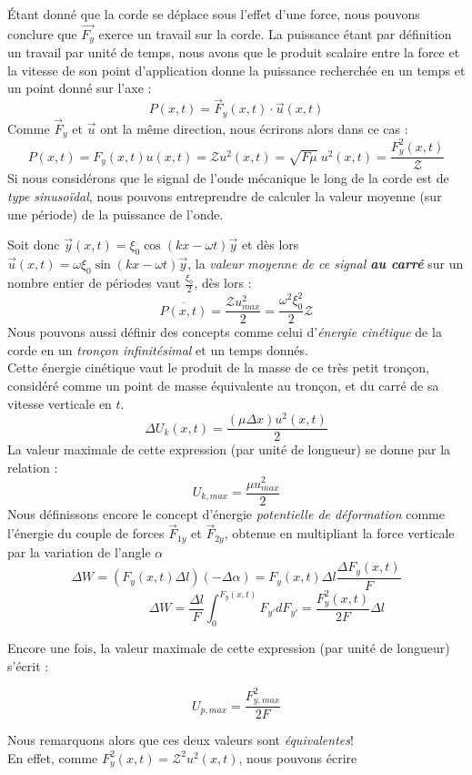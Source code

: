 Étant donné que la corde se déplace sous l'effet d'une force, nous pouvons conclure que $\vec{F_{y}}$ exerce un travail sur la corde. 
La puissance étant par définition un travail par unité de temps, nous avons que le produit scalaire entre la force et la vitesse de son point d'application 
donne la puissance recherchée en un temps et un point donné sur l'axe :
\[P(x,t) = \vec{F}_{y}(x,t) \cdot \vec{u}(x,t) \]
Comme $\vec{F}_{y}$ et $\vec{u}$ ont la même direction, nous écrirons alors dans ce cas : 
\[ P(x,t) = F_{y}(x,t) u(x,t) = \mathcal{Z} u^{2}(x,t) = \sqrt{F \mu}\: u^{2}(x,t) = \frac{F_{y}^2(x,t)}{\mathcal{Z}}\]
Si nous considérons que le signal de l'onde mécanique le long de la corde est de \textit{type sinusoïdal}, 
nous pouvons entreprendre de calculer la valeur moyenne (sur une période) de la puissance de l'onde. 

Soit donc $\vec{y}(x,t) = \xi_{0} \cos(kx-\omega t) \vec{y}$ et dès lors $\vec{u}(x,t) = \omega \xi_{0} \sin(kx-\omega t) \vec{y}$, la \textit{valeur moyenne de ce signal \textbf{au carré}} sur un nombre entier de périodes vaut $\frac{\xi_{0}}{2}$, dès lors : 
\[ \overline{P(x,t)} = \frac{\mathcal{Z} u^{2}_{max}}{2} = \frac{\omega^{2} \xi_{0}^{2}}{2} \mathcal{Z}\]
Nous pouvons aussi définir des concepts comme celui d'\textit{énergie cinétique} de la corde en un \textit{tronçon infinitésimal} et un temps donnés. \\
Cette énergie cinétique vaut le produit de la masse de ce très petit tronçon, considéré comme un point de masse équivalente au tronçon, et du carré de sa vitesse
verticale en $t$. 
\[\Delta U_{k}(x,t) = \frac{(\mu \Delta x)u^{2}(x,t)}{2} \] 
La valeur maximale de cette expression (par unité de longueur) se donne par la relation : 
\[U_{k,max} = \frac{\mu u_{max}^{2}}{2}\]
Nous définissons encore le concept d'énergie \textit{potentielle de déformation} comme l'énergie du couple de forces $\vec{F}_{1y}$ et $\vec{F}_{2y}$, obtenue en multipliant la force verticale par la variation de l'angle $\alpha$
\[\Delta W = (F_{y}(x,t) \Delta l)(-\Delta \alpha)= F_{y}(x,t) \Delta l \frac{\Delta F_{y}(x,t)}{F} \]
\[\hspace{2cm} \Delta W = \frac{\Delta l}{F} \int_{0}^{F_{y}(x,t)} F_{y'} dF_{y'} = \frac{F_{y}^{2}(x,t)}{2F}\Delta l \]

Encore une fois, la valeur maximale de cette expression (par unité de longueur) s'écrit : 

\[U_{p,max} = \frac{F_{y,max}^{2}}{2F}\]

Nous remarquons alors que ces deux valeurs sont \textit{équivalentes}! 
\\ En effet, comme $F_{y}^{2}(x,t)  = \mathcal{Z}^{2} u^{2}(x,t)$, nous pouvons écrire 

